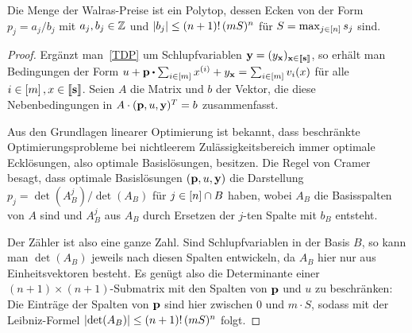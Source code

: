 \begin{lemma}
	Die Menge der Walras-Preise ist ein Polytop, dessen Ecken von der Form $p_j = a_j/b_j$ mit $a_j,b_j\in\mathbb{Z}$ und
	$\left\lvert b_j \right\rvert \leq (n+1)!\, (mS)^n$
	für $S = \max_{j\in\left[ n \right]} s_j$ sind.
\end{lemma}
\begin{proof}
	Ergänzt man~\eqref{TDP} um Schlupfvariablen $\mathbf{y}=(y_{\mathbf{x}})_{\mathbf{x}\in\left\llbracket \mathbf{s} \right\rrbracket}$, so erhält man Bedingungen der Form $ u + \fp \bcdot \sum_{i\in\first{m}} x^{(i)} + y_{\fx} = \sum_{i\in\first{m}} v_i(x) $ für alle $i\in\left[ m \right], x\in\left\llbracket \mathbf{s} \right\rrbracket$.
	Seien $A$ die Matrix und $b$ der Vektor, die diese Nebenbedingungen in $A \cdot (\mathbf{p}, u, \mathbf{y})^T = b$ zusammenfasst.
	
	
	Aus den Grundlagen linearer Optimierung ist bekannt, dass beschränkte Optimierungsprobleme bei nichtleerem Zulässigkeitsbereich immer optimale Ecklösungen, also optimale Basislösungen, besitzen.
	Die Regel von Cramer besagt, dass optimale Basislösungen $(\mathbf{p}, u, \mathbf{y})$ die Darstellung $p_j = \det(A_B^j) / \det(A_B)$ für $j\in\left[ n \right]\cap B$ haben, wobei $A_B$ die Basisspalten von $A$ sind und $A_B^j$ aus $A_B$ durch Ersetzen der $j$-ten Spalte mit $b_B$ entsteht.
	
	Der Zähler ist also eine ganze Zahl.
	Sind Schlupfvariablen in der Basis $B$, so kann man $\det(A_B)$ jeweils nach diesen Spalten entwickeln, da $A_B$ hier nur aus Einheitsvektoren besteht.
	Es genügt also die Determinante einer $(n+1)\times(n+1)$-Submatrix mit den Spalten von $\mathbf{p}$ und $u$ zu beschränken:
 	Die Einträge der Spalten von $\mathbf{p}$ sind hier zwischen 0 und $m\cdot S$, sodass mit der Leibniz-Formel $\left\lvert \det(A_B) \right\rvert \leq (n+1)!\, (m S)^{n}$ folgt.
\end{proof}